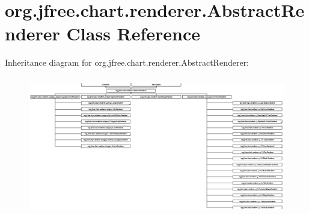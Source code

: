 \hypertarget{classorg_1_1jfree_1_1chart_1_1renderer_1_1_abstract_renderer}{}\section{org.\+jfree.\+chart.\+renderer.\+Abstract\+Renderer Class Reference}
\label{classorg_1_1jfree_1_1chart_1_1renderer_1_1_abstract_renderer}
Inheritance diagram for org.\+jfree.\+chart.\+renderer.\+Abstract\+Renderer\+:\begin{figure}[H]
\begin{center}
\leavevmode
\includegraphics[height=6.061856cm]{classorg_1_1jfree_1_1chart_1_1renderer_1_1_abstract_renderer}
\end{center}
\end{figure}
